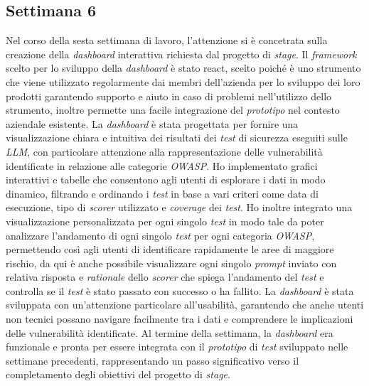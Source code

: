 \subsection{Settimana 6}
Nel corso della sesta settimana di lavoro, l'attenzione si è concetrata sulla creazione della \emph{dashboard} interattiva richiesta dal progetto di \emph{stage}. Il \emph{framework} scelto per lo sviluppo della \emph{dashboard} è stato \gls{react}\glsfirstoccur, scelto poiché è uno strumento che viene utilizzato regolarmente dai membri dell'azienda per lo sviluppo dei loro prodotti garantendo supporto e aiuto in caso di problemi nell'utilizzo dello strumento, inoltre permette una facile integrazione del \emph{prototipo} nel contesto aziendale esistente. La \emph{dashboard} è stata progettata per fornire una visualizzazione chiara e intuitiva dei risultati dei \emph{test} di sicurezza eseguiti sulle \emph{LLM}, con particolare attenzione alla rappresentazione delle vulnerabilità identificate in relazione alle categorie \emph{OWASP}. Ho implementato grafici interattivi e tabelle che consentono agli utenti di esplorare i dati in modo dinamico, filtrando e ordinando i \emph{test} in base a vari criteri come data di esecuzione, tipo di \emph{scorer} utilizzato e \emph{coverage} dei \emph{test}. Ho inoltre integrato una visualizzazione personalizzata per ogni singolo \emph{test} in modo tale da poter analizzare l'andamento di ogni singolo \emph{test} per ogni categoria \emph{OWASP}, permettendo così agli utenti di identificare rapidamente le aree di maggiore rischio, da qui è anche possibile visualizzare ogni singolo \emph{prompt} inviato con relativa risposta e \emph{rationale} dello \emph{scorer} che spiega l'andamento del \emph{test} e controlla se il \emph{test} è stato passato con successo o ha fallito. La \emph{dashboard} è stata sviluppata con un'attenzione particolare all'usabilità, garantendo che anche utenti non tecnici possano navigare facilmente tra i dati e comprendere le implicazioni delle vulnerabilità identificate. Al termine della settimana, la \emph{dashboard} era funzionale e pronta per essere integrata con il \emph{prototipo} di \emph{test} sviluppato nelle settimane precedenti, rappresentando un passo significativo verso il completamento degli obiettivi del progetto di \emph{stage}.

